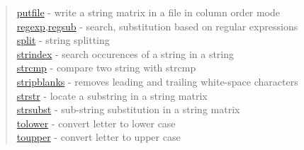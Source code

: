 \begin{quote}
\hyperlink{putfile}{putfile} - write a string matrix in a file in column order mode \\
\hyperlink{regexp}{regexp},\hyperlink{regsub}{regsub} - search, substitution based on regular expressions\\
\hyperlink{split}{split} - string splitting\\
\hyperlink{strindex}{strindex} - search occurences of a string in a string\\
\hyperlink{strcmp}{strcmp} - compare two string with strcmp \\
\hyperlink{stripblanks}{stripblanks} - removes leading and trailing white-space characters\\
\hyperlink{strstr}{strstr} - locate a substring in a string matrix\\
\hyperlink{strsubst}{strsubst} - sub-string substitution in a string matrix\\
\hyperlink{tolower}{tolower} - convert letter to lower case\\
\hyperlink{toupper}{toupper} - convert letter to upper case
\end{quote}




















